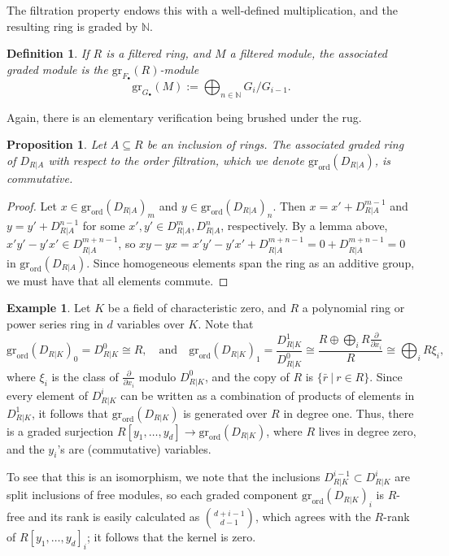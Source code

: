 \documentclass[11pt]{book}
\newtheorem{proposition}[theorem]{Proposition}
\newtheorem{definition}[theorem]{Definition}
\numberwithin{equation}{section}
\numberwithin{theorem}{chapter}
\theoremstyle{definition}
\newtheorem{example}[theorem]{Example}
\newtheorem*{basic properties}{Basic Properties}
\newtheorem*{Important Remark}{Important Remark}
\theoremstyle{remark}
\newcommand{\NN}{\mathbb{N}}
\begin{document}
The filtration property endows this with a well-defined multiplication, and the resulting ring is graded by $\NN$.

\begin{definition}
	If $R$ is a filtered ring, and $M$ a filtered module, the \emph{associated graded module} is the $\mathrm{gr}_{F_\bullet}(R)$-module
	\[ \mathrm{gr}_{G_\bullet}(M) := \bigoplus_{n \in \NN} G_i/G_{i-1}. \]
\end{definition}

Again, there is an elementary verification being brushed under the rug.

\begin{proposition} Let $A\subseteq R$ be an inclusion of rings. The associated graded ring of $D_{R|A}$ with respect to the order filtration, which we denote $\mathrm{gr}_{\mathrm{ord}}(D_{R|A})$, is commutative.
\end{proposition}
\begin{proof}
	Let $x\in \mathrm{gr}_{\mathrm{ord}}(D_{R|A})_m$ and $y\in \mathrm{gr}_{\mathrm{ord}}(D_{R|A})_n$. Then $x=x'+D^{m-1}_{R|A}$ and $y=y'+D^{n-1}_{R|A}$ for some $x',y'\in D^m_{R|A},D^n_{R|A}$, respectively. By a lemma above, $x'y'-y'x'\in D^{m+n-1}_{R|A}$, so $xy-yx=x'y'-y'x' + D^{m+n-1}_{R|A} = 0 +D^{m+n-1}_{R|A}=0$ in $\mathrm{gr}_{\mathrm{ord}}(D_{R|A})$. Since homogeneous elements span the ring as an additive group, we must have that all elements commute.
\end{proof}

\begin{example}
	Let $K$ be a field of characteristic zero, and $R$ a polynomial ring or power series ring in $d$ variables over $K$. Note that \[\mathrm{gr}_{\mathrm{ord}}(D_{R|K})_0=D^0_{R|K}\cong R, \quad \text{and} \quad \mathrm{gr}_{\mathrm{ord}}(D_{R|K})_1=\frac{D^1_{R|K}}{D^0_{R|K}}\cong \frac{R \oplus \bigoplus_i R \frac{\partial}{\partial x_i}}{R} \cong \bigoplus_i R \xi_i,\]
	where $\xi_i$ is the class of $\frac{\partial}{\partial x_i}$ modulo $D^0_{R|K}$, and the copy of $R$ is $\{ \bar{r} \ | \ r\in R\}$. Since every element of $D^i_{R|K}$ can be written as a combination of products of elements in $D^1_{R|K}$, it follows that $\mathrm{gr}_{\mathrm{ord}}(D_{R|K})$ is generated over $R$ in degree one. Thus, there is a graded surjection $R[y_1,\dots,y_d]\to \mathrm{gr}_{\mathrm{ord}}(D_{R|K})$, where $R$ lives in degree zero, and the $y_i$'s are (commutative) variables.
	
	To see that this is an isomorphism, we note that the inclusions $D^{i-1}_{R|K}\subset D^{i}_{R|K}$ are split inclusions of free modules, so each graded component $\mathrm{gr}_{\mathrm{ord}}(D_{R|K})_i$ is $R$-free and its rank is easily calculated as $\binom{d+i-1}{d-1}$, which agrees with the $R$-rank of $R[y_1,\dots,y_d]_i$; it follows that the kernel is zero.
\end{example}
\end{document}
